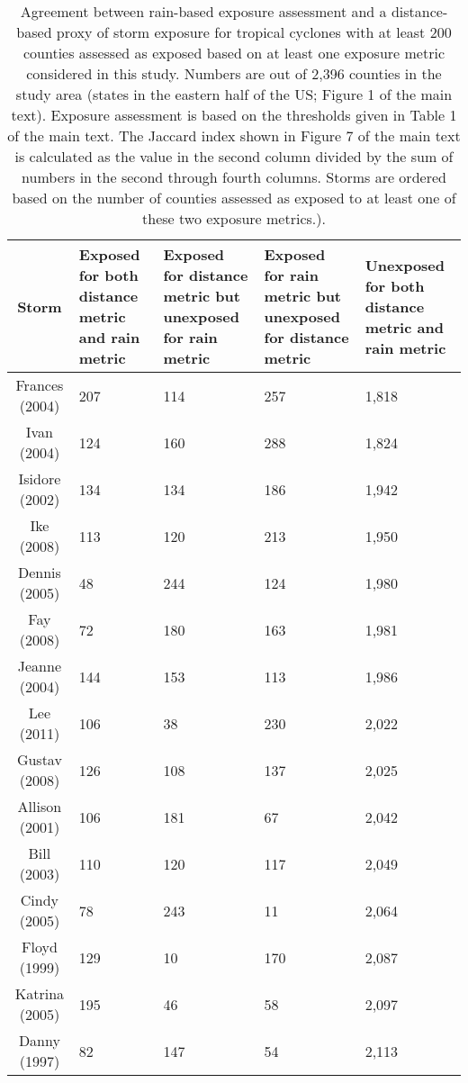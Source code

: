 \begin{table}[ht]
\centering
\caption{Agreement between rain-based exposure assessment and a distance-based
         proxy of storm exposure for tropical cyclones with at least 200 counties assessed 
         as exposed based on at least one exposure metric considered in this study. Numbers 
         are out of 2,396 counties in the study area (states in the eastern half of the US; 
         Figure 1 of the main text). Exposure assessment is based on the thresholds given in 
         Table 1 of the main text. The Jaccard index shown in Figure 7 of the main text is 
         calculated as the value in the second column divided by the sum of numbers in the 
         second through fourth columns.  Storms are ordered based on the number of counties 
         assessed as exposed to at least one of these two exposure metrics.).} 
\label{tab:misclassrain}
\begin{tabular}{cP{3cm}P{3cm}P{3cm}P{3cm}}
  \toprule
Storm & Exposed for both distance metric and rain metric & Exposed for distance metric but unexposed for rain metric & Exposed for rain metric but unexposed for distance metric & Unexposed for both distance metric and rain metric \\ 
  \midrule
Frances (2004) & 207 & 114 & 257 & 1,818 \\ 
  Ivan (2004) & 124 & 160 & 288 & 1,824 \\ 
  Isidore (2002) & 134 & 134 & 186 & 1,942 \\ 
  Ike (2008) & 113 & 120 & 213 & 1,950 \\ 
  Dennis (2005) & 48 & 244 & 124 & 1,980 \\ 
  Fay (2008) & 72 & 180 & 163 & 1,981 \\ 
  Jeanne (2004) & 144 & 153 & 113 & 1,986 \\ 
  Lee (2011) & 106 & 38 & 230 & 2,022 \\ 
  Gustav (2008) & 126 & 108 & 137 & 2,025 \\ 
  Allison (2001) & 106 & 181 & 67 & 2,042 \\ 
  Bill (2003) & 110 & 120 & 117 & 2,049 \\ 
  Cindy (2005) & 78 & 243 & 11 & 2,064 \\ 
  Floyd (1999) & 129 & 10 & 170 & 2,087 \\ 
  Katrina (2005) & 195 & 46 & 58 & 2,097 \\ 
  Danny (1997) & 82 & 147 & 54 & 2,113 \\ 

\end{tabular}
\end{table}
